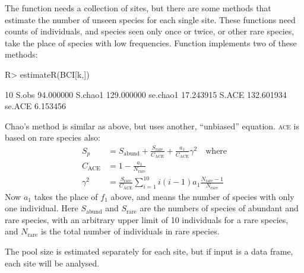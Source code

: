 \documentclass[article,nojss]{jss}
\begin{document}
The  function needs a collection of sites, but there
are some methods that estimate the number of unseen species for each
single site.  These functions need counts of individuals, and species
seen only once or twice, or other rare species, take the place of
species with low frequencies.  Function  implements
two of these methods:
\begin{Schunk}
\begin{Sinput}
R> estimateR(BCI[k,])
\end{Sinput}
\begin{Soutput}
                 10
S.obs     94.000000
S.chao1  129.000000
se.chao1  17.243915
S.ACE    132.601934
se.ACE     6.153456
\end{Soutput}
\end{Schunk}
Chao's method is similar as above, but uses another, ``unbiased''
equation. \textsc{ace} is based on rare species also:
\begin{equation}
\begin{split}
S_p &= S_\mathrm{abund} + \frac{S_\mathrm{rare}}{C_\mathrm{ACE}} +
\frac{a_1}{C_\mathrm{ACE}} \gamma^2 \quad \text{where}\\
C_\mathrm{ACE} &= 1 - \frac{a_1}{N_\mathrm{rare}}\\
\gamma^2 &= \frac{S_\mathrm{rare}}{C_\mathrm{ACE}} \sum_{i=1}^{10} i
(i-1) a_1 \frac{N_\mathrm{rare} - 1}{N_\mathrm{rare}}
\end{split}
\end{equation}
Now $a_1$ takes the place of $f_1$ above, and means the number of
species with only one individual.
Here $S_\mathrm{abund}$ and $S_\mathrm{rare}$ are the numbers of
species of abundant and rare species, with an arbitrary upper limit of
10 individuals for a rare species, and $N_\mathrm{rare}$ is the total
number of individuals in rare species.

The pool size
is estimated separately for each site, but if input is a data frame,
each site will be analysed.
\end{document}
